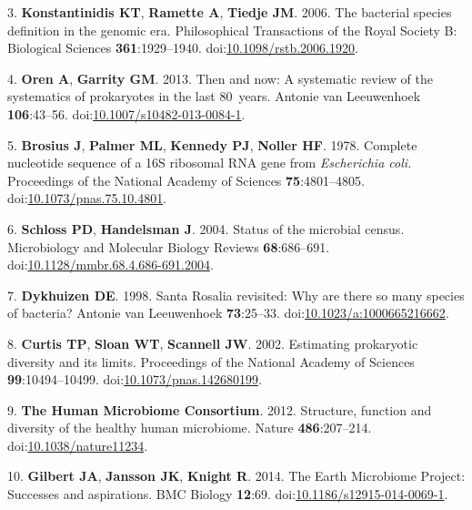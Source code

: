 \documentclass[11pt,]{article}
\begin{document}
\hypertarget{ref-Konstantinidis2006}{}
3. \textbf{Konstantinidis KT}, \textbf{Ramette A}, \textbf{Tiedje JM}.
2006. The bacterial species definition in the genomic era. Philosophical
Transactions of the Royal Society B: Biological Sciences
\textbf{361}:1929--1940.
doi:\href{https://doi.org/10.1098/rstb.2006.1920}{10.1098/rstb.2006.1920}.

\hypertarget{ref-Oren2013}{}
4. \textbf{Oren A}, \textbf{Garrity GM}. 2013. Then and now: A
systematic review of the systematics of prokaryotes in the last
80~years. Antonie van Leeuwenhoek \textbf{106}:43--56.
doi:\href{https://doi.org/10.1007/s10482-013-0084-1}{10.1007/s10482-013-0084-1}.

\hypertarget{ref-Brosius1978}{}
5. \textbf{Brosius J}, \textbf{Palmer ML}, \textbf{Kennedy PJ},
\textbf{Noller HF}. 1978. Complete nucleotide sequence of a 16S
ribosomal RNA gene from \emph{Escherichia coli.} Proceedings of the
National Academy of Sciences \textbf{75}:4801--4805.
doi:\href{https://doi.org/10.1073/pnas.75.10.4801}{10.1073/pnas.75.10.4801}.

\hypertarget{ref-Schloss2004}{}
6. \textbf{Schloss PD}, \textbf{Handelsman J}. 2004. Status of the
microbial census. Microbiology and Molecular Biology Reviews
\textbf{68}:686--691.
doi:\href{https://doi.org/10.1128/mmbr.68.4.686-691.2004}{10.1128/mmbr.68.4.686-691.2004}.

\hypertarget{ref-Dykhuizen1998}{}
7. \textbf{Dykhuizen DE}. 1998. Santa Rosalia revisited: Why are there
so many species of bacteria? Antonie van Leeuwenhoek \textbf{73}:25--33.
doi:\href{https://doi.org/10.1023/a:1000665216662}{10.1023/a:1000665216662}.

\hypertarget{ref-Curtis2002}{}
8. \textbf{Curtis TP}, \textbf{Sloan WT}, \textbf{Scannell JW}. 2002.
Estimating prokaryotic diversity and its limits. Proceedings of the
National Academy of Sciences \textbf{99}:10494--10499.
doi:\href{https://doi.org/10.1073/pnas.142680199}{10.1073/pnas.142680199}.

\hypertarget{ref-HMP2012}{}
9. \textbf{The Human Microbiome Consortium}. 2012. Structure, function
and diversity of the healthy human microbiome. Nature
\textbf{486}:207--214.
doi:\href{https://doi.org/10.1038/nature11234}{10.1038/nature11234}.

\hypertarget{ref-Gilbert2014}{}
10. \textbf{Gilbert JA}, \textbf{Jansson JK}, \textbf{Knight R}. 2014.
The Earth Microbiome Project: Successes and aspirations. BMC Biology
\textbf{12}:69.
doi:\href{https://doi.org/10.1186/s12915-014-0069-1}{10.1186/s12915-014-0069-1}.
\end{document}
